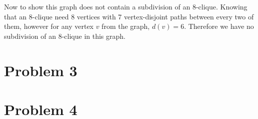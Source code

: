 \documentclass[11pt]{article}
\begin{document}
Now to show this graph does not contain a subdivision of an 8-clique. Knowing that an 8-clique need 8 vertices with 7 vertex-disjoint paths between every two of them, however for any vertex $v$ from the graph, $d(v) = 6$. Therefore we have no subdivision of an 8-clique in this graph.


\section*{Problem 3}

\section*{Problem 4}



%
% 
% 
\end{document}
